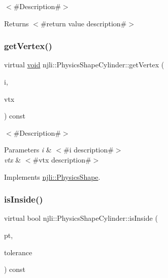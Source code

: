 $<$\#\+Description\#$>$

\begin{DoxyReturn}{Returns}
$<$\#return value description\#$>$ 
\end{DoxyReturn}
\mbox{\label{classnjli_1_1_physics_shape_cylinder_a8e138b8eefcf94a6d8a7296ac2c883bf}} 
\subsubsection{\texorpdfstring{get\+Vertex()}{getVertex()}}
{\footnotesize\ttfamily virtual \mbox{\hyperlink{_thread_8h_af1e856da2e658414cb2456cb6f7ebc66}{void}} njli\+::\+Physics\+Shape\+Cylinder\+::get\+Vertex (\begin{DoxyParamCaption}\item[{int}]{i,  }\item[{bt\+Vector3 \&}]{vtx }\end{DoxyParamCaption}) const\hspace{0.3cm}{\ttfamily [virtual]}}

$<$\#\+Description\#$>$


\begin{DoxyParams}{Parameters}
{\em i} & $<$\#i description\#$>$ \\
\hline
{\em vtx} & $<$\#vtx description\#$>$ \\
\hline
\end{DoxyParams}


Implements \mbox{\hyperlink{classnjli_1_1_physics_shape_acb05a16bdbfa5cee6dcbab5c253eb78e}{njli\+::\+Physics\+Shape}}.

\mbox{\label{classnjli_1_1_physics_shape_cylinder_a74ebf6b5c2ca835e1cfaaa1bec156ef3}} 
\subsubsection{\texorpdfstring{is\+Inside()}{isInside()}}
{\footnotesize\ttfamily virtual bool njli\+::\+Physics\+Shape\+Cylinder\+::is\+Inside (\begin{DoxyParamCaption}\item[{const bt\+Vector3 \&}]{pt,  }\item[{\mbox{\hyperlink{_util_8h_a5f6906312a689f27d70e9d086649d3fd}{f32}}}]{tolerance }\end{DoxyParamCaption}) const\hspace{0.3cm}{\ttfamily [virtual]}}


